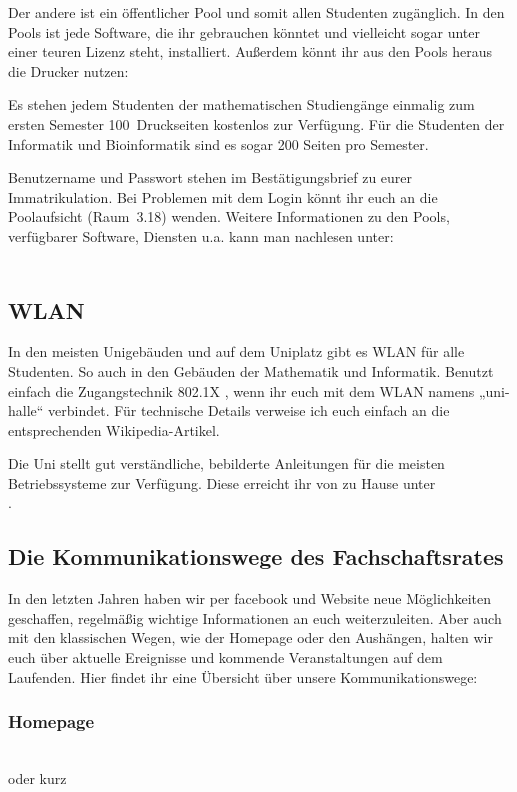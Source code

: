 Der andere ist ein öffentlicher Pool und somit allen Studenten zugänglich.
In den Pools ist jede Software, die ihr gebrauchen könntet und vielleicht sogar unter einer teuren Lizenz steht, installiert.
Außerdem könnt ihr aus den Pools heraus die Drucker nutzen:

Es stehen jedem Studenten der mathematischen Studiengänge einmalig zum ersten Semester 100~Druckseiten kostenlos zur Verfügung.
Für die Studenten der Informatik und Bioinformatik sind es sogar 200 Seiten pro Semester.

Benutzername und Passwort stehen im Bestätigungsbrief zu eurer Immatrikulation.
Bei Problemen mit dem Login könnt ihr euch an die Poolaufsicht (Raum~3.18) wenden.
Weitere Informationen zu den Pools, verfügbarer Software, Diensten u.a. kann man nachlesen unter:\\[1.0em]
\\ 

\subsection{WLAN}

In den meisten Unigebäuden und auf dem Uniplatz gibt es WLAN für alle Studenten.
So auch in den Gebäuden der Mathematik und Informatik.
Benutzt einfach die Zugangstechnik 802.1X , wenn ihr euch mit dem WLAN namens „uni-halle“ verbindet.
Für technische Details verweise ich euch einfach an die entsprechenden Wikipedia-Artikel.

Die Uni stellt gut verständliche, bebilderte Anleitungen für die meisten Betriebssysteme zur Verfügung.
Diese erreicht ihr von zu Hause unter\\
    .


\subsection[Kommunikationswege des FSR]{Die Kommunikationswege des Fachschaftsrates}
In den letzten Jahren haben wir per facebook und Website neue Mög\-lich\-kei\-ten geschaffen, regelmäßig wichtige Informationen an euch
weiterzuleiten.
Aber auch mit den klassischen Wegen, wie der Homepage oder den Aushängen, halten wir euch über aktuelle Ereignisse und kommende Veranstaltungen
auf dem Laufenden.
Hier findet ihr eine Übersicht über unsere Kommunikationswege:

\subsubsection{Homepage}
     \\
    oder kurz 
